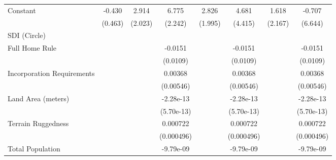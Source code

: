 {\begin{tabular}{l*{7}{c}}
\addlinespace
Constant            &      -0.430         &       2.914         &       6.775\sym{**} &       2.826         &       4.681         &       1.618         &      -0.707         \\
                    &     (0.463)         &     (2.023)         &     (2.242)         &     (1.995)         &     (4.415)         &     (2.167)         &     (6.644)         \\
\midrule
SDI (Circle)        &                     &                     &                     &                     &                     &                     &                     \\
Full Home Rule      &                     &                     &     -0.0151         &                     &     -0.0151         &                     &     -0.0151         \\
                    &                     &                     &    (0.0109)         &                     &    (0.0109)         &                     &    (0.0109)         \\
\addlinespace
Incorporation Requirements&                     &                     &     0.00368         &                     &     0.00368         &                     &     0.00368         \\
                    &                     &                     &   (0.00546)         &                     &   (0.00546)         &                     &   (0.00546)         \\
\addlinespace
Land Area (meters)  &                     &                     &   -2.28e-13         &                     &   -2.28e-13         &                     &   -2.28e-13         \\
                    &                     &                     &  (5.70e-13)         &                     &  (5.70e-13)         &                     &  (5.70e-13)         \\
\addlinespace
Terrain Ruggedness  &                     &                     &    0.000722         &                     &    0.000722         &                     &    0.000722         \\
                    &                     &                     &  (0.000496)         &                     &  (0.000496)         &                     &  (0.000496)         \\
\addlinespace
Total Population    &                     &                     &   -9.79e-09         &                     &   -9.79e-09         &                     &   -9.79e-09         \\

\end{tabular}}
